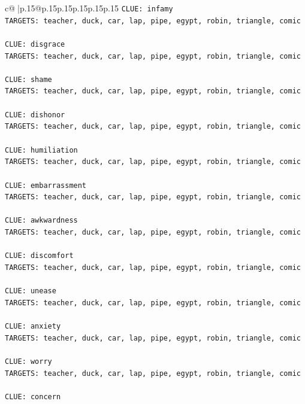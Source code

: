 \documentclass{article}
\begin{document}
{\begin{supertabular}{c@{$\;$}|p{.15\linewidth}@{}p{.15\linewidth}p{.15\linewidth}p{.15\linewidth}p{.15\linewidth}p{.15\linewidth}}
{{{\texttt{CLUE: infamy} \\
\texttt{TARGETS: teacher, duck, car, lap, pipe, egypt, robin, triangle, comic} \\
\\ 
\texttt{CLUE: disgrace} \\
\texttt{TARGETS: teacher, duck, car, lap, pipe, egypt, robin, triangle, comic} \\
\\ 
\texttt{CLUE: shame} \\
\texttt{TARGETS: teacher, duck, car, lap, pipe, egypt, robin, triangle, comic} \\
\\ 
\texttt{CLUE: dishonor} \\
\texttt{TARGETS: teacher, duck, car, lap, pipe, egypt, robin, triangle, comic} \\
\\ 
\texttt{CLUE: humiliation} \\
\texttt{TARGETS: teacher, duck, car, lap, pipe, egypt, robin, triangle, comic} \\
\\ 
\texttt{CLUE: embarrassment} \\
\texttt{TARGETS: teacher, duck, car, lap, pipe, egypt, robin, triangle, comic} \\
\\ 
\texttt{CLUE: awkwardness} \\
\texttt{TARGETS: teacher, duck, car, lap, pipe, egypt, robin, triangle, comic} \\
\\ 
\texttt{CLUE: discomfort} \\
\texttt{TARGETS: teacher, duck, car, lap, pipe, egypt, robin, triangle, comic} \\
\\ 
\texttt{CLUE: unease} \\
\texttt{TARGETS: teacher, duck, car, lap, pipe, egypt, robin, triangle, comic} \\
\\ 
\texttt{CLUE: anxiety} \\
\texttt{TARGETS: teacher, duck, car, lap, pipe, egypt, robin, triangle, comic} \\
\\ 
\texttt{CLUE: worry} \\
\texttt{TARGETS: teacher, duck, car, lap, pipe, egypt, robin, triangle, comic} \\
\\ 
\texttt{CLUE: concern} \\
}}}
\end{supertabular}}
\end{document}
